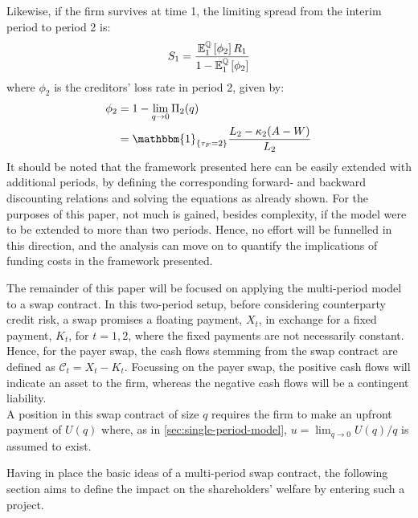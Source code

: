 \documentclass[main.tex]{subfiles}
\begin{document}
        Likewise, if the firm survives at time 1, 
        the limiting spread from the interim period to period 2 is:
        \begin{equation*}
            S_1 =
            \frac{
                \mathbb{E}_{1}^{\mathbb{Q}}\left[\phi_2\right]R_1
            }{
                1 - \mathbb{E}_{1}^{\mathbb{Q}}\left[\phi_2\right] 
            }
        \end{equation*}
        where $\phi_{2}$ is the creditors' loss rate in period 2, given by:
        \begin{align*}
            \phi_2 
            &=
            1 - \lim_{q\rightarrow0} \Pi_{2}(q) 
            \nonumber \\
            &=
            \mathbbm{1}_{\{\tau_{F}=2\}}
            \frac{
                L_{2}-\kappa_{2}(A-W)
            }{
                L_{2}
            }
        \end{align*}
        It should be noted that the framework presented here can be easily extended 
        with additional periods, 
        by defining the corresponding forward- and backward discounting relations
        and solving the equations as already shown.
        For the purposes of this paper, not much is gained, besides complexity, 
        if the model were to be extended to more than two periods.
        Hence, no effort will be funnelled in this direction,
        and the analysis can move on to quantify the implications of funding costs
        in the framework presented.

        The remainder of this paper will be focused on applying the multi-period model 
        to a swap contract.
        In this two-period setup, before considering counterparty credit risk, a swap promises a floating payment, $X_t$, in exchange for a fixed payment, $K_t$, for $t = 1,2$, where the fixed payments are not necessarily constant.
        Hence, for the payer swap, the cash flows stemming from the swap contract are defined as $\mathcal{C}_t = X_t - K_t$.
        Focussing on the payer swap, the positive cash flows will indicate an asset to the firm, whereas the negative cash flows will be a contingent liability.
        \\
        A position in this swap contract of size $q$ requires the firm to make an upfront payment of $U(q)$ where, as in \cref{sec:single-period-model}, $u = \lim_{q \rightarrow 0} U(q)/q$ is assumed to exist.

        Having in place the basic ideas of a multi-period swap contract,
        the following section aims to define the impact on the shareholders' welfare by entering such a project.
\end{document}
